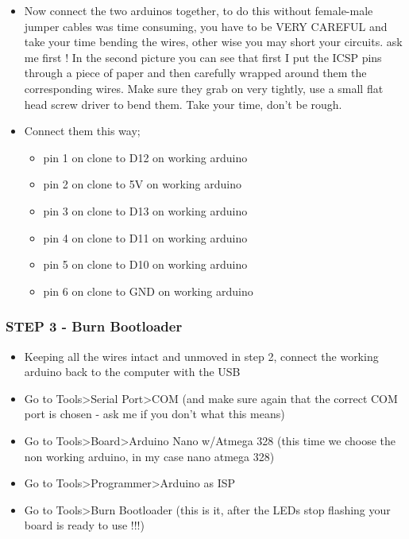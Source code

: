 \begin{itemize}
  \item Now connect the two arduinos together, to do this without female-male jumper cables was time consuming, you have to be VERY CAREFUL and take your time bending the wires, other wise you may short your circuits. ask me first ! In the second picture you can see that first I put the ICSP pins through a piece of paper and then carefully wrapped around them the corresponding wires. Make sure they grab on very tightly, use a small flat head screw driver to bend them. Take your time, don't be rough.
  \item Connect them this way;
    \begin{itemize}
      \item pin 1 on clone to D12 on working arduino
      \item pin 2 on clone to 5V on working arduino
      \item pin 3 on clone to D13 on working arduino
      \item pin 4 on clone to D11 on working arduino
      \item pin 5 on clone to D10 on working arduino
      \item pin 6 on clone to GND on working arduino
    \end{itemize}
\end{itemize}

\subsubsection{STEP 3 - Burn Bootloader}

\begin{itemize}
  \item Keeping all the wires intact and unmoved in step 2, connect the working arduino back to the computer with the USB
  \item Go to Tools>Serial Port>COM (and make sure again that the correct COM port is chosen - ask me if you don't what this means)
  \item Go to Tools>Board>Arduino Nano w/Atmega 328 (this time we choose the non working arduino, in my case nano atmega 328)
  \item Go to Tools>Programmer>Arduino as ISP
  \item Go to Tools>Burn Bootloader (this is it, after the LEDs stop flashing your board is ready to use !!!)
\end{itemize}


\bigskip


